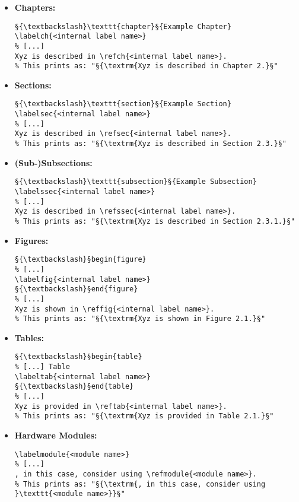 \begin{itemize}
\item \textbf{Chapters:}
\begin{lstlisting}[style=LaTeXStyle]
§{\textbackslash}\texttt{chapter}§{Example Chapter}
\labelch{<internal label name>}
% [...]
Xyz is described in \refch{<internal label name>}.
% This prints as: "§{\textrm{Xyz is described in Chapter 2.}§"
\end{lstlisting}

\item \textbf{Sections:}
\begin{lstlisting}[style=LaTeXStyle]
§{\textbackslash}\texttt{section}§{Example Section}
\labelsec{<internal label name>}
% [...]
Xyz is described in \refsec{<internal label name>}.
% This prints as: "§{\textrm{Xyz is described in Section 2.3.}§"
\end{lstlisting}

\item \textbf{(Sub-)Subsections:}
\begin{lstlisting}[style=LaTeXStyle]
§{\textbackslash}\texttt{subsection}§{Example Subsection}
\labelssec{<internal label name>}
% [...]
Xyz is described in \refssec{<internal label name>}.
% This prints as: "§{\textrm{Xyz is described in Section 2.3.1.}§"
\end{lstlisting}

\item \textbf{Figures:}
\begin{lstlisting}[style=LaTeXStyle]
§{\textbackslash}§begin{figure}
% [...]
\labelfig{<internal label name>}
§{\textbackslash}§end{figure}
% [...]
Xyz is shown in \reffig{<internal label name>}.
% This prints as: "§{\textrm{Xyz is shown in Figure 2.1.}§"
\end{lstlisting}

\item \textbf{Tables:}
\begin{lstlisting}[style=LaTeXStyle]
§{\textbackslash}§begin{table}
% [...] Table
\labeltab{<internal label name>}
§{\textbackslash}§end{table}
% [...]
Xyz is provided in \reftab{<internal label name>}.
% This prints as: "§{\textrm{Xyz is provided in Table 2.1.}§"
\end{lstlisting}

\item \textbf{Hardware Modules:}
\begin{lstlisting}[style=LaTeXStyle]
\labelmodule{<module name>}
% [...]
, in this case, consider using \refmodule{<module name>}.
% This prints as: "§{\textrm{, in this case, consider using }\texttt{<module name>}}§"
\end{lstlisting}


\end{itemize}
